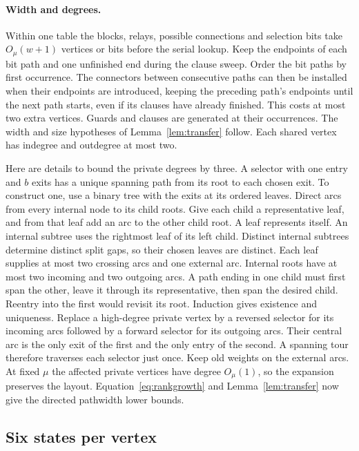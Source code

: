\documentclass[11pt]{article}
\theoremstyle{definition}
\begin{document}
\paragraph{Width and degrees.}
Within one table the blocks, relays, possible connections and selection bits take \(O_\mu(w+1)\) vertices or bits before the serial lookup. Keep the endpoints of each bit path and one unfinished end during the clause sweep. Order the bit paths by first occurrence. The connectors between consecutive paths can then be installed when their endpoints are introduced, keeping the preceding path's endpoints until the next path starts, even if its clauses have already finished. This costs at most two extra vertices. Guards and clauses are generated at their occurrences. The width and size hypotheses of Lemma~\ref{lem:transfer} follow. Each shared vertex has indegree and outdegree at most two.

Here are details to bound the private degrees by three. A selector with one entry and \(b\) exits has a unique spanning path from its root to each chosen exit. To construct one, use a binary tree with the exits at its ordered leaves. Direct arcs from every internal node to its child roots. Give each child a representative leaf, and from that leaf add an arc to the other child root. A leaf represents itself. An internal subtree uses the rightmost leaf of its left child. Distinct internal subtrees determine distinct split gaps, so their chosen leaves are distinct. Each leaf supplies at most two crossing arcs and one external arc. Internal roots have at most two incoming and two outgoing arcs. A path ending in one child must first span the other, leave it through its representative, then span the desired child. Reentry into the first would revisit its root. Induction gives existence and uniqueness. Replace a high-degree private vertex by a reversed selector for its incoming arcs followed by a forward selector for its outgoing arcs. Their central arc is the only exit of the first and the only entry of the second. A spanning tour therefore traverses each selector just once. Keep old weights on the external arcs. At fixed \(\mu\) the affected private vertices have degree \(O_\mu(1)\), so the expansion preserves the layout. Equation~\eqref{eq:rankgrowth} and Lemma~\ref{lem:transfer} now give the directed pathwidth lower bounds.

\subsection{Six states per vertex}
\end{document}
